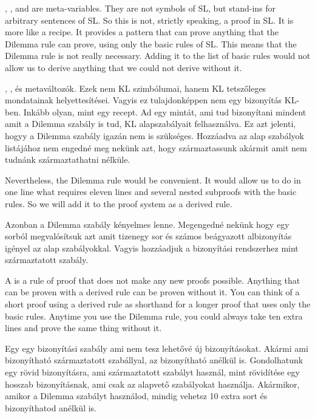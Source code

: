 

, , and  are meta-variables. They are not symbols of SL, but stand-ins for arbitrary sentences of SL. So this is not, strictly speaking, a proof in SL. It is more like a recipe. It provides a pattern that can prove anything that the Dilemma rule can prove, using only the basic rules of SL. This means that the Dilemma rule is not really necessary. Adding it to the list of basic rules would not allow us to derive anything that we could not derive without it.

, , és  metaváltozók. Ezek nem KL szimbólumai, hanem KL tetszőleges mondatainak helyettesítései. Vagyis ez tulajdonképpen nem egy bizonyítás KL-ben. Inkább olyan, mint egy recept. Ad egy mintát, ami tud bizonyítani mindent amit a Dilemma szabály is tud, KL alapszabályait felhasználva. Ez azt jelenti, hogyy a Dilemma szabály igazán nem is szükséges. Hozzáadva az alap szabályok listájához nem engedné meg nekünk azt, hogy származtassunk akármit amit nem tudnánk származtathatni nélküle.

Nevertheless, the Dilemma rule would be convenient. It would allow us to do in one line what requires eleven lines and several nested subproofs with the basic rules. So we will add it to the proof system as a derived rule.

Azonban a Dilemma szabály kényelmes lenne. Megengedné nekünk hogy egy sorból megvalósítsuk azt amit tizenegy sor és számos beágyazott albizonyítás igényel az alap szabályokkal. Vagyis hozzáadjuk a bizonyítási rendszerhez mint származtatott szabály.

A  is a rule of proof that does not make any new proofs possible. Anything that can be proven with a derived rule can be proven without it. You can think of a short proof using a derived rule as shorthand for a longer proof that uses only the basic rules. Anytime you use the Dilemma rule, you could always take ten extra lines and prove the same thing without it.

Egy  egy bizonyítási szabály ami nem tesz lehetővé új bizonyításokat. Akármi ami bizonyítható származtatott szabállyal, az bizonyítható anélkül is. Gondolhatunk egy rövid bizonyításra, ami származtatott szabályt használ, mint rövidítése egy hosszab bizonyításnak, ami csak az alapvető szabályokat használja. Akármikor, amikor a Dilemma szabályt használod, mindig vehetsz 10 extra sort és bizonyíthatod anélkül is.

